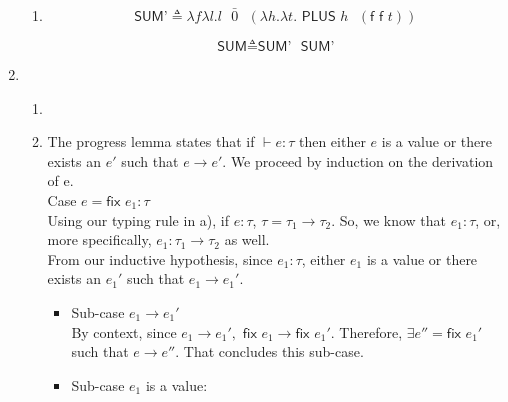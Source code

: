 \documentclass[10pt, oneside]{article}
\begin{document}
\begin{enumerate}
\begin{enumerate}
		
		
		\item $$\textsf{SUM'} \triangleq \lambda f\lambda l.l \text{ } \bar{0} \text{ } (\lambda h.\lambda t.\textsf{ PLUS } h \text{ } (\textsf{f f } t))$$
		
			$$\textsf{SUM} \triangleq \textsf{SUM'} \textsf{ } \textsf{SUM'}$$
		
	\end{enumerate}
	
	\item 
		\begin{enumerate}
		\item \text{ } \\
		\begin{prooftree}
		\end{prooftree}
		

		\item The progress lemma states that if $\vdash e : \tau $ then either $e$ is a value or there exists an $e'$ such that $ e \rightarrow e'.$
		We proceed by induction on the derivation of e.\\
					
		{\sc Case} $e =  \textsf{fix } e_1: \tau$\\
		
		Using our typing rule in a), if $e: \tau$, $\tau =  \tau_1 \rightarrow \tau_2.$ So, we know that $e_1: \tau$, or, more specifically, $e_1: \tau_1 \rightarrow \tau_2$ as well.\\
		
		From our inductive hypothesis, since  $e_1: \tau$,  either $e_1$ is a value or there exists an $e_1'$ such that $e_1 \rightarrow e_1'.$\\
		
		\begin{itemize}
		\item {\sc Sub-case} $e_1 \rightarrow e_1'$ \\
		
		By {\sc context}, since $e_1 \rightarrow e_1',$ $\textsf{fix } e_1 \rightarrow \textsf{fix }e_1'.$ Therefore, $\exists e'' = \textsf{fix }e_1'$ such that $e \rightarrow e''.$ That concludes this sub-case. \checkmark \checkmark \\
		
		\item {\sc Sub-case} $e_1$ is a value:\\
		

\end{itemize}
\end{enumerate}
\end{enumerate}
\end{document}
